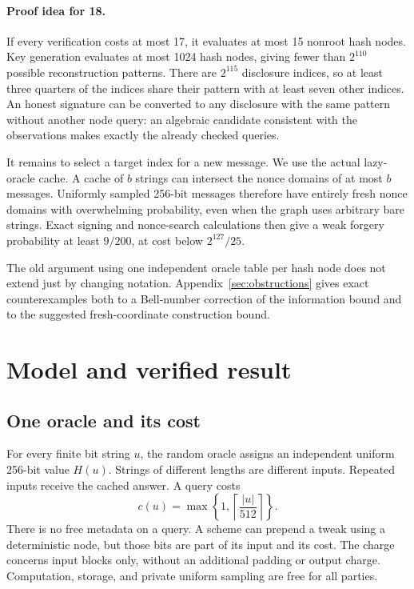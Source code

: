 \documentclass[10pt]{article}
\begin{document}
\paragraph{Proof idea for 18.}
If every verification costs at most 17, it evaluates at most 15 nonroot hash nodes. Key generation evaluates at most 1024 hash nodes, giving fewer than $2^{110}$ possible reconstruction patterns. There are $2^{115}$ disclosure indices, so at least three quarters of the indices share their pattern with at least seven other indices. An honest signature can be converted to any disclosure with the same pattern without another node query: an algebraic candidate consistent with the observations makes exactly the already checked queries.

It remains to select a target index for a new message. We use the actual lazy-oracle cache. A cache of $b$ strings can intersect the nonce domains of at most $b$ messages. Uniformly sampled 256-bit messages therefore have entirely fresh nonce domains with overwhelming probability, even when the graph uses arbitrary bare strings. Exact signing and nonce-search calculations then give a weak forgery probability at least $9/200$, at cost below $2^{127}/25$.

The old argument using one independent oracle table per hash node does not extend just by changing notation. Appendix~\ref{sec:obstructions} gives exact counterexamples both to a Bell-number correction of the information bound and to the suggested fresh-coordinate construction bound.

\section{Model and verified result}\label{sec:model}

\subsection{One oracle and its cost}

For every finite bit string $u$, the random oracle assigns an independent uniform 256-bit value $H(u)$. Strings of different lengths are different inputs. Repeated inputs receive the cached answer. A query costs
\[
c(u)=\max\left\{1,\left\lceil\frac{|u|}{512}\right\rceil\right\}.
\]
There is no free metadata on a query. A scheme can prepend a tweak using a deterministic node, but those bits are part of its input and its cost. The charge concerns input blocks only, without an additional padding or output charge. Computation, storage, and private uniform sampling are free for all parties.
\end{document}
